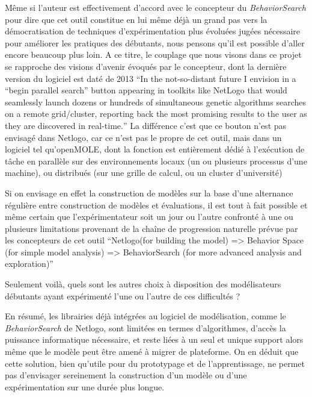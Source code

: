 Même si l'auteur est effectivement d'accord avec le concepteur du \textit{BehaviorSearch} pour dire que cet outil constitue en lui même déjà un grand pas vers la démocratisation de techniques d'expérimentation plus évoluées jugées nécessaire pour améliorer les pratiques des débutants, nous pensons qu'il est possible d'aller encore beaucoup plus loin. A ce titre, le couplage que nous visons dans ce projet se rapproche des visions d'avenir évoqués par le concepteur, dont la dernière version du logiciel est daté de 2013 \textcite[295]{Stonedahl2011a} \foreignquote{english}{In the not-so-distant future I envision in a “begin parallel search” button appearing in toolkits like NetLogo that would seamlessly launch dozens or hundreds of simultaneous genetic algorithms searches on a remote grid/cluster, reporting back the most promising results to the user as they are discovered in real-time.} La différence c'est que ce bouton n'est pas envisagé dans Netlogo, car ce n'est pas le propre de cet outil, mais dans un logiciel tel qu'openMOLE, dont la fonction est entièrement dédié à l'exécution de tâche en parallèle sur des environnements locaux (un ou plusieurs processus d'une machine), ou distribués (sur une grille de calcul, ou un cluster d'université)

Si on envisage en effet la construction de modèles sur la base d'une alternance régulière entre construction de modèles et évaluations, il est tout à fait possible et même certain que l'expérimentateur soit un jour ou l'autre confronté à une ou plusieurs limitations provenant de la chaîne de progression naturelle prévue par les concepteurs de cet outil \foreignquote{english}{Netlogo(for building the model) => Behavior Space (for simple model analysis) => BehaviorSearch (for more advanced analysis and exploration)} \autocite[340]{Stonedahl2011a} 

Seulement voilà, quels sont les autres choix à disposition des modélisateurs débutants ayant expérimenté l'une ou l'autre de ces difficultés ? 

En résumé, les librairies déjà intégrées au logiciel de modélisation, comme le \textit{BehaviorSearch} de Netlogo, sont limitées en termes d'algorithmes, d'accès la puissance informatique nécessaire, et reste liées à un seul et unique support alors même que le modèle peut être amené à migrer de plateforme. On en déduit que cette solution, bien qu'utile pour du prototypage et de l'apprentissage, ne permet pas d'envisager sereinement la construction d'un modèle ou d'une expérimentation sur une durée plus longue.

